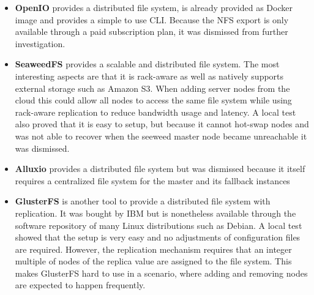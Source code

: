 \begin{itemize}
	\item \textbf{OpenIO}\cite{openio:main}\label{openio} provides a distributed file system, is already provided as Docker image and provides a simple to use CLI. Because the NFS export is only available through a paid subscription plan, it was dismissed from further investigation.
	\item \textbf{SeaweedFS}\cite{seeweedfs:main}\label{seaweedfs} provides a scalable and distributed file system. The most interesting aspects are that it is rack-aware as well as natively supports external storage such as Amazon S3. When adding server nodes from the cloud this could allow all nodes to access the same file system while using rack-aware replication to reduce bandwidth usage and latency. A local test also proved that it is easy to setup, but because it cannot hot-swap nodes and was not able to recover when the seeweed master node became unreachable it was dismissed.
	\item \textbf{Alluxio}\cite{alluxio:main}\label{alluxio} provides a distributed file system but was dismissed because it itself requires a centralized file system for the master and its fallback instances
	\item \textbf{GlusterFS}\cite{glusterfs:main}\label{glusterfs} is another tool to provide a distributed file system with replication. It was bought by IBM but is nonetheless available through the software repository of many Linux distributions such as Debian. A local test showed that the setup is very easy and no adjustments of configuration files are required. However, the replication mechanism requires that an integer multiple of nodes of the replica value are assigned to the file system. This makes GlusterFS hard to use in a scenario, where adding and removing nodes are expected to happen frequently. 
\end{itemize}

